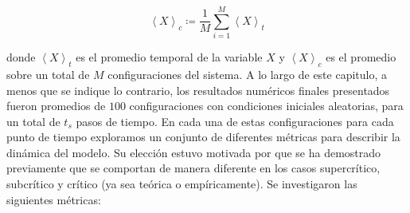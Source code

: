 \begin{equation}\label{eq:63}
	\left\langle X\right\rangle_c \coloneqq  \frac{1}{M}\sum_{i=1}^{M} \left\langle X \right\rangle_t 
\end{equation}

donde $\left\langle X \right\rangle_t $  es el promedio temporal de la variable $X$ y $\left\langle X\right\rangle_c$ es el promedio sobre un total de $M$ configuraciones del sistema. A lo largo de este capitulo, a menos que se indique lo contrario, los resultados numéricos finales presentados fueron promedios de $100$ configuraciones  con condiciones iniciales aleatorias, para un total de $t_s$ pasos de tiempo.  En cada una de estas configuraciones para cada punto de tiempo  exploramos un conjunto de diferentes métricas para describir la dinámica del modelo. Su elección estuvo motivada por que  se ha demostrado previamente que se comportan de manera diferente en los casos supercrítico, subcrítico y crítico (ya sea teórica o empíricamente). Se investigaron las siguientes métricas:



